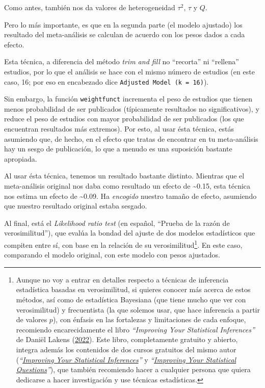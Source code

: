 \documentclass[
  bookmarksnumbered]{article}
\begin{document}
Como antes, también nos da valores de heterogeneidad \(\tau^2\), \(\tau\) y \(Q\).

Pero lo más importante, es que en la segunda parte (el modelo ajustado) los resultado del meta-análisis se calculan de acuerdo con los pesos dados a cada efecto.

Esta técnica, a diferencia del método \emph{trim and fill} no ``recorta'' ni ``rellena'' estudios, por lo que el análisis se hace con el mismo número de estudios (en este caso, 16; por eso en encabezado dice \texttt{Adjusted\ Model\ (k\ =\ 16)}).

Sin embargo, la función \texttt{weightfunct} incrementa el peso de estudios que tienen menos probabilidad de ser publicados (típicamente resultados no significativos), y reduce el peso de estudios con mayor probabilidad de ser publicados (los que encuentran resultados más extremos). Por esto, al usar ésta técnica, estás asumiendo que, de hecho, en el efecto que tratas de encontrar en tu meta-análisis hay un sesgo de publicación, lo que a menudo es una suposición bastante apropiada.

Al usar ésta técnica, tenemos un resultado bastante distinto. Mientras que el meta-análisis original nos daba como resultado un efecto de \textasciitilde0.15, esta técnica nos estima un efecto de \textasciitilde0.09. Ha \emph{encogido} nuestro tamaño de efecto, asumiendo que nuestro resultado original estaba sesgado.

Al final, está el \emph{Likelihood ratio test} (en español, ``Prueba de la razón de verosimilitud''), que evalúa la bondad del ajuste de dos modelos estadísticos que compiten entre sí, con base en la relación de su verosimilitud\footnote{Aunque no voy a entrar en detalles respecto a técnicas de inferencia estadística basadas en verosimilitud, si quieres conocer más acerca de estos métodos, así como de estadística Bayesiana (que tiene mucho que ver con verosimilitud) y frecuentista (la que solemos usar, que hace inferencia a partir de valores \(p\)), con énfasis en las fortalezas y limitaciones de cada enfoque, recomiendo encarecidamente el libro \emph{``Improving Your Statistical Inferences''} de Daniël Lakens (\protect\hyperlink{ref-lakensImprovingYourStatistical2022}{2022}). Este libro, completamente gratuito y abierto, integra además los contenidos de dos cursos gratuitos del mismo autor (\emph{``\href{https://www.coursera.org/learn/statistical-inferences}{Improving Your Statistical Inferences}''} y \emph{``\href{https://www.coursera.org/learn/improving-statistical-questions}{Improving Your Statistical Questions}''}), que también recomiendo hacer a cualquier persona que quiera dedicarse a hacer investigación y use técnicas estadísticas.}. En este caso, comparando el modelo original, con este modelo con pesos ajustados.
\end{document}

